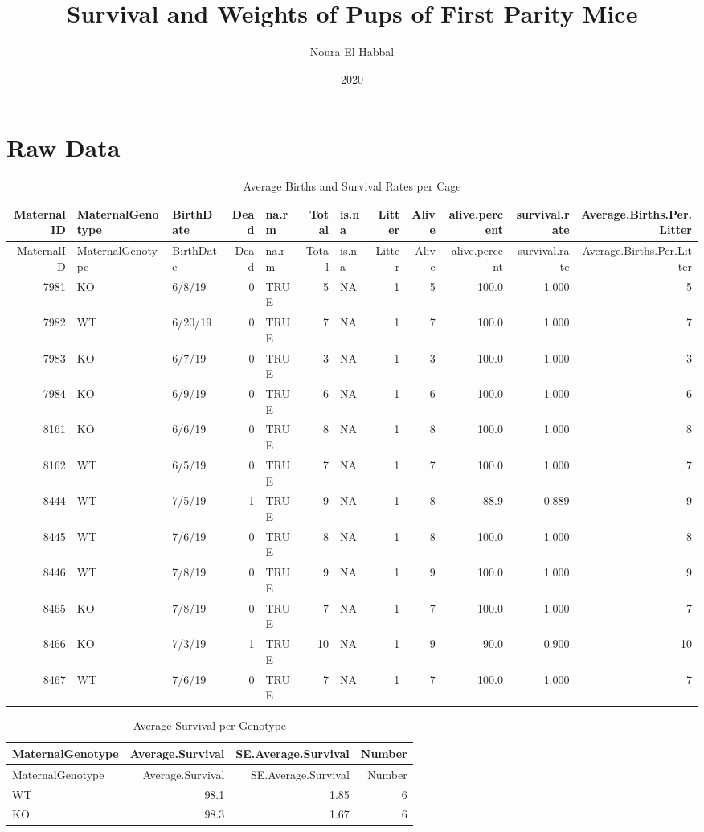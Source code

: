 \documentclass[]{article}
\title{Survival and Weights of Pups of First Parity Mice}
\author{Noura El Habbal}
\date{2020}
\begin{document}
\maketitle

{
\setcounter{tocdepth}{2}
\tableofcontents
}
\section{Raw Data}\label{raw-data}

\begin{longtable}[]{@{}rllrlrlrrrrr@{}}
\caption{Average Births and Survival Rates per Cage}\tabularnewline
\toprule
MaternalID & MaternalGenotype & BirthDate & Dead & na.rm & Total & is.na
& Litter & Alive & alive.percent & survival.rate &
Average.Births.Per.Litter\tabularnewline
\midrule
\endfirsthead
\toprule
MaternalID & MaternalGenotype & BirthDate & Dead & na.rm & Total & is.na
& Litter & Alive & alive.percent & survival.rate &
Average.Births.Per.Litter\tabularnewline
\midrule
\endhead
7981 & KO & 6/8/19 & 0 & TRUE & 5 & NA & 1 & 5 & 100.0 & 1.000 &
5\tabularnewline
7982 & WT & 6/20/19 & 0 & TRUE & 7 & NA & 1 & 7 & 100.0 & 1.000 &
7\tabularnewline
7983 & KO & 6/7/19 & 0 & TRUE & 3 & NA & 1 & 3 & 100.0 & 1.000 &
3\tabularnewline
7984 & KO & 6/9/19 & 0 & TRUE & 6 & NA & 1 & 6 & 100.0 & 1.000 &
6\tabularnewline
8161 & KO & 6/6/19 & 0 & TRUE & 8 & NA & 1 & 8 & 100.0 & 1.000 &
8\tabularnewline
8162 & WT & 6/5/19 & 0 & TRUE & 7 & NA & 1 & 7 & 100.0 & 1.000 &
7\tabularnewline
8444 & WT & 7/5/19 & 1 & TRUE & 9 & NA & 1 & 8 & 88.9 & 0.889 &
9\tabularnewline
8445 & WT & 7/6/19 & 0 & TRUE & 8 & NA & 1 & 8 & 100.0 & 1.000 &
8\tabularnewline
8446 & WT & 7/8/19 & 0 & TRUE & 9 & NA & 1 & 9 & 100.0 & 1.000 &
9\tabularnewline
8465 & KO & 7/8/19 & 0 & TRUE & 7 & NA & 1 & 7 & 100.0 & 1.000 &
7\tabularnewline
8466 & KO & 7/3/19 & 1 & TRUE & 10 & NA & 1 & 9 & 90.0 & 0.900 &
10\tabularnewline
8467 & WT & 7/6/19 & 0 & TRUE & 7 & NA & 1 & 7 & 100.0 & 1.000 &
7\tabularnewline
\bottomrule
\end{longtable}

\begin{longtable}[]{@{}lrrr@{}}
\caption{Average Survival per Genotype}\tabularnewline
\toprule
MaternalGenotype & Average.Survival & SE.Average.Survival &
Number\tabularnewline
\midrule
\endfirsthead
\toprule
MaternalGenotype & Average.Survival & SE.Average.Survival &
Number\tabularnewline
\midrule
\endhead
WT & 98.1 & 1.85 & 6\tabularnewline
KO & 98.3 & 1.67 & 6\tabularnewline
\bottomrule
\end{longtable}
\end{document}
